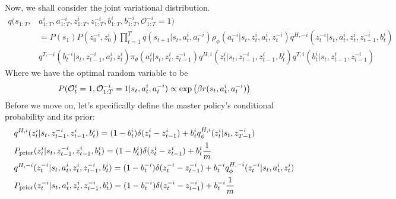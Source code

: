Now, we shall consider the joint variational distribution. 
\begin{equation}
\begin{aligned}
    q(s_{1:T}, &a^i_{1:T}, a^{-i}_{1:T}, z^i_{1:T}, z^{-i}_{1:T}, b^i_{1:T}, b^{-i}_{1:T}, \mathcal{O}^{-i}_{1:T} = 1) \\
    &= P(s_1)P(z^{-i}_0, z^i_0)\prod^T_{t=1} q(s_{t+1} | s_t, a_t^i, a_t^{-i})\rho_\phi(a^{-i}_t | s_t, z^i_t, a^i_t, z^{-i}_t) q^{H,-i}(z^{-i}_t | s_t, a^i_t, z^i_t, z^{-i}_{t-1}, b^i_t) \\
    &q^{T,-i}(b^{-i}_t | s_t,  z^{-i}_{t-1}, a^i_t, z^i_t) \pi_\theta(a^i_t | s_t, z^i_t, z^{-i}_{t-1}) q^{H,i}(z^i_t | s_t, z^{-i}_{t-1}, z^i_{t-1}, b^i_t) q^{T,i}(b^i_t | s_t, z^i_{t-1}, z^{-i}_{t-1})
\end{aligned}
\end{equation}
Where we have the optimal random variable to be 
\begin{equation}
    P(\mathcal{O}^i_t = 1, \mathcal{O}^{-i}_{1:T} = 1 | s_t, a^i_t, a^{-i}_t) \propto \exp\left( \beta r(s_t, a_t^i, a^{-i}_t) \right)
\end{equation}
Before we move on, let's specifically define the master policy's conditional probability and its prior:
\begin{equation}
\begin{aligned}
    &q^{H, i}(z^i_t | s_t, z^{-i}_{t-1}, z^i_{t-1}, b^i_t) = (1-b_t^i) \delta(z_t^i  - z_{t-1}^i) + b_t^i q^{H, i}_{\phi}(z_t^i | s_t, z^{-i}_{T-1}) \\
    &P_{\text{prior}}(z^i_t | s_t, z^{-i}_{t-1}, z^i_{t-1}, b^i_t) = (1-b_t^i) \delta(z_t^i  - z_{t-1}^i) + b_t^i \frac{1}{m} \\
    &q^{H, -i}(z^{-i}_t | s_t, a^i_t, z^i_t, z^{-i}_{t-1}, b^i_t) = (1-b_t^{-i}) \delta(z_t^{-i}  - z_{t-1}^{-i}) + b_t^{-i} q^{H, -i}_{\phi}(z_t^{-i} | s_t, a^i_t, z^i_t) \\
    &P_{\text{prior}}(z^{-i}_t | s_t, a^i_t, z^i_t, z^{-i}_{t-1}, b^i_t) = (1-b_t^{-i}) \delta(z_t^{-i}  - z_{t-1}^{-i}) + b_t^{-i} \frac{1}{m} \\
\end{aligned}
\end{equation}
